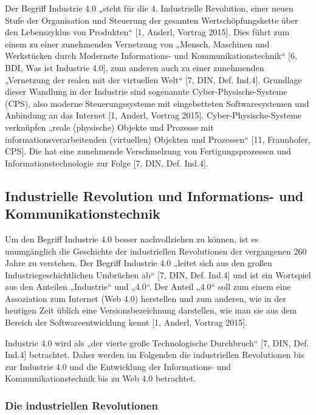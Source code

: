 Der Begriff Industrie 4.0 „steht für die 4. Industrielle Revolution, einer neuen Stufe der Organisation und Steuerung der gesamten Wertschöpfungskette über den Lebenszyklus von Produkten“ [1, Anderl, Vortrag 2015]. Dies führt zum einem zu einer zunehmenden Vernetzung von „Mensch, Maschinen und Werkstücken durch Modernste Informations- und Kommunikationstechnik“ [6, BDI, Was ist Industrie 4.0], zum anderen auch zu einer zunehmenden „Vernetzung der realen mit der virtuellen Welt“ [7, DIN, Def. Ind.4]. Grundlage dieser Wandlung in der Industrie sind sogenannte Cyber-Physische-Systeme (CPS), also moderne Steuerungssysteme mit eingebetteten Softwaresystemen und Anbindung an das Internet [1, Anderl, Vortrag 2015]. Cyber-Physische-Systeme verknüpfen „reale (physische) Objekte und Prozesse mit informationsverarbeitenden (virtuellen) Objekten und Prozessen“ [11, Fraunhofer, CPS]. Die hat eine zunehmende Verschmelzung von Fertigungsprozessen und Informationstechnologie zur Folge [7, DIN, Def. Ind.4].

\subsection{Industrielle Revolution und Informations- und Kommunikationstechnik}\label{sec:GeschichteIndustrie4}

Um den Begriff Industrie 4.0 besser nachvollziehen zu können, ist es unumgänglich die Geschichte der industriellen Revolutionen der vergangenen 260 Jahre zu verstehen. Der Begriff Industrie 4.0 „leitet sich aus den großen Industriegeschichtlichen Umbrüchen ab“ [7, DIN, Def. Ind.4] und ist ein Wortspiel aus den Anteilen „Industrie“ und „4.0“. Der Anteil „4.0“ soll zum einem eine Assoziation zum Internet (Web 4.0) herstellen und zum anderen, wie in der heutigen Zeit üblich eine Versionsbezeichnung darstellen, wie man sie aus dem Bereich der Softwareentwicklung kennt [1, Anderl, Vortrag 2015].

Industrie 4.0 wird als „der vierte große Technologische Durchbruch“ [7, DIN, Def. Ind.4] betrachtet. Daher werden im Folgenden die industriellen Revolutionen bis zur Industrie 4.0 und die Entwicklung der Informations- und Kommunikationstechnik bis zu Web 4.0 betrachtet.


\subsubsection{Die industriellen Revolutionen}\label{sec:IndustrielleRevolution}

